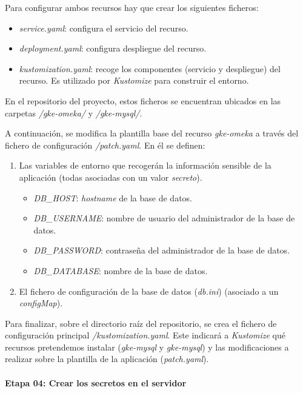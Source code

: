 \documentclass[
]{article}
\providecommand{\tightlist}{%
  \setlength{\itemsep}{0pt}\setlength{\parskip}{0pt}}
\begin{document}
Para configurar ambos recursos hay que crear los siguientes ficheros:

\begin{itemize}
\tightlist
\item
  \emph{service.yaml}: configura el servicio del recurso.
\item
  \emph{deployment.yaml}: configura despliegue del recurso.
\item
  \emph{kustomization.yaml}: recoge los componentes (servicio y
  despliegue) del recurso. Es utilizado por \emph{Kustomize} para
  construir el entorno.
\end{itemize}

En el repositorio del proyecto, estos ficheros se encuentran ubicados en
las carpetas \emph{/gke-omeka/} y \emph{/gke-mysql/}.

A continuación, se modifica la plantilla base del recurso
\emph{gke-omeka} a través del fichero de configuración
\emph{/patch.yaml}. En él se definen:

\begin{enumerate}
\def\labelenumi{\arabic{enumi}.}
\tightlist
\item
  Las variables de entorno que recogerán la información sensible de la
  aplicación (todas asociadas con un valor \emph{secreto}).

  \begin{itemize}
  \tightlist
  \item
    \emph{DB\_HOST}: \emph{hostname} de la base de datos.
  \item
    \emph{DB\_USERNAME}: nombre de usuario del administrador de la base
    de datos.
  \item
    \emph{DB\_PASSWORD}: contraseña del administrador de la base de
    datos.
  \item
    \emph{DB\_DATABASE}: nombre de la base de datos.
  \end{itemize}
\item
  El fichero de configuración de la base de datos (\emph{db.ini})
  (asociado a un \emph{configMap}).
\end{enumerate}

Para finalizar, sobre el directorio raíz del repositorio, se crea el
fichero de configuración principal \emph{/kustomization.yaml}. Este
indicará a \emph{Kustomize} qué recursos pretendemos instalar
(\emph{gke-mysql} y \emph{gke-mysql}) y las modificaciones a realizar
sobre la plantilla de la aplicación (\emph{patch.yaml}).

\hypertarget{etapa-04-crear-los-secretos-en-el-servidor}{%
\paragraph{Etapa 04: Crear los secretos en el
servidor}\label{etapa-04-crear-los-secretos-en-el-servidor}}
\end{document}
